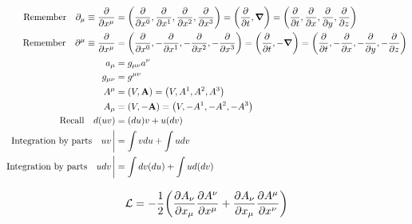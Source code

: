 \documentclass[letterpaper]{article}
\theoremstyle{definition}
\begin{document}
\begin{align*}
  \qq*{Remember}\partial_\mu\equiv\pdv{x^\mu} & =\pqty{\pdv{x^0},\pdv{x^1},\pdv{x^2},\pdv{x^3}}=\pqty{\pdv{t},\grad}=\pqty{\pdv{t},\pdv{x},\pdv{y},\pdv{z}}        \\
  \qq*{Remember}\partial^\mu\equiv\pdv{x^\mu} & =\pqty{\pdv{x^0},-\pdv{x^1},-\pdv{x^2},-\pdv{x^3}}=\pqty{\pdv{t},-\grad}=\pqty{\pdv{t},-\pdv{x},-\pdv{y},-\pdv{z}} \\
  a_\mu                                       & =g_{\mu\nu}a^\nu                                                                                                   \\
  g_{\mu\nu}                                  & =g^{\mu\nu}                                                                                                        \\
  A^\mu                                       & =\pqty{V,\vb{A}}=\pqty{V,A^1,A^2,A^3}                                                                              \\
  A_\mu                                       & =\pqty{V,-\vb{A}}=\pqty{V,-A^1,-A^2,-A^3}                                                                          \\
  \qq*{Recall} d (uv)                         & =  (du)v +  u (dv)                                                                                                 \\
  \qq*{Integration by parts} uv\eval          & =\int  v du + \int u dv                                                                                            \\
  \qq*{Integration by parts} udv\eval         & =\int dv (du) + \int u d(dv)                                                                                       \\
\end{align*}

\begin{align*}
  \mathcal{L} & =-\frac{1}{2}\pqty{\pdv{A_\nu}{x_\mu}\pdv{A^\nu}{x^\mu}+\pdv{A_\nu}{x_\mu}\pdv{A^\mu}{x^\nu}  } \\
\end{align*}
\end{document}
